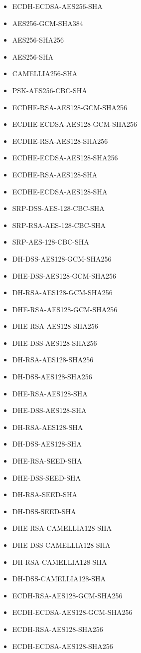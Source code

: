 \documentclass[a4paper,11pt]{article}
\begin{document}
\begin{itemize}
\item ECDH-ECDSA-AES256-SHA
\item AES256-GCM-SHA384
\item AES256-SHA256
\item AES256-SHA
\item CAMELLIA256-SHA
\item PSK-AES256-CBC-SHA
\item ECDHE-RSA-AES128-GCM-SHA256
\item ECDHE-ECDSA-AES128-GCM-SHA256
\item ECDHE-RSA-AES128-SHA256
\item ECDHE-ECDSA-AES128-SHA256
\item ECDHE-RSA-AES128-SHA
\item ECDHE-ECDSA-AES128-SHA
\item SRP-DSS-AES-128-CBC-SHA
\item SRP-RSA-AES-128-CBC-SHA
\item SRP-AES-128-CBC-SHA
\item DH-DSS-AES128-GCM-SHA256
\item DHE-DSS-AES128-GCM-SHA256
\item DH-RSA-AES128-GCM-SHA256
\item DHE-RSA-AES128-GCM-SHA256
\item DHE-RSA-AES128-SHA256
\item DHE-DSS-AES128-SHA256
\item DH-RSA-AES128-SHA256
\item DH-DSS-AES128-SHA256
\item DHE-RSA-AES128-SHA
\item DHE-DSS-AES128-SHA
\item DH-RSA-AES128-SHA
\item DH-DSS-AES128-SHA
\item DHE-RSA-SEED-SHA
\item DHE-DSS-SEED-SHA
\item DH-RSA-SEED-SHA
\item DH-DSS-SEED-SHA
\item DHE-RSA-CAMELLIA128-SHA
\item DHE-DSS-CAMELLIA128-SHA
\item DH-RSA-CAMELLIA128-SHA
\item DH-DSS-CAMELLIA128-SHA
\item ECDH-RSA-AES128-GCM-SHA256
\item ECDH-ECDSA-AES128-GCM-SHA256
\item ECDH-RSA-AES128-SHA256
\item ECDH-ECDSA-AES128-SHA256

\end{itemize}
\end{document}
